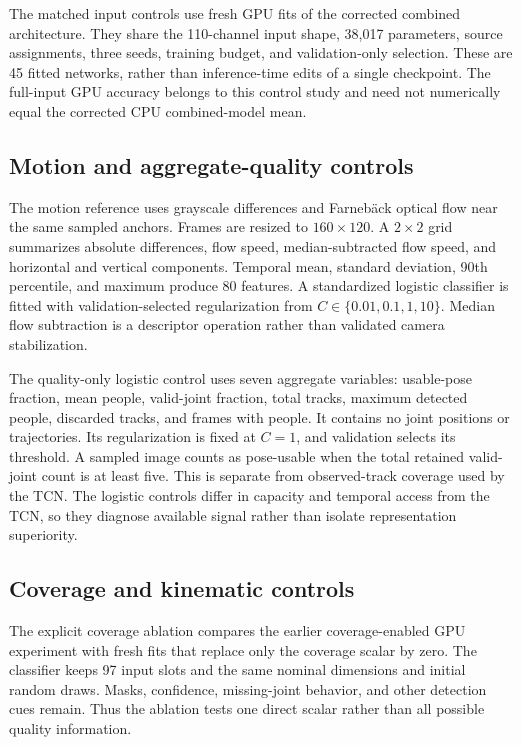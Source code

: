 \documentclass[journal]{IEEEtai}
\begin{document}
The matched input controls use fresh GPU fits of the corrected combined architecture. They share the 110-channel input shape, 38,017 parameters, source assignments, three seeds, training budget, and validation-only selection. These are 45 fitted networks, rather than inference-time edits of a single checkpoint. The full-input GPU accuracy belongs to this control study and need not numerically equal the corrected CPU combined-model mean.

\subsection{Motion and aggregate-quality controls}
The motion reference uses grayscale differences and Farneb\"ack optical flow \cite{farneback2003} near the same sampled anchors. Frames are resized to $160\times120$. A $2\times2$ grid summarizes absolute differences, flow speed, median-subtracted flow speed, and horizontal and vertical components. Temporal mean, standard deviation, 90th percentile, and maximum produce 80 features. A standardized logistic classifier is fitted with validation-selected regularization from $C\in\{0.01,0.1,1,10\}$. Median flow subtraction is a descriptor operation rather than validated camera stabilization.

The quality-only logistic control uses seven aggregate variables: usable-pose fraction, mean people, valid-joint fraction, total tracks, maximum detected people, discarded tracks, and frames with people. It contains no joint positions or trajectories. Its regularization is fixed at $C=1$, and validation selects its threshold. A sampled image counts as pose-usable when the total retained valid-joint count is at least five. This is separate from observed-track coverage used by the TCN. The logistic controls differ in capacity and temporal access from the TCN, so they diagnose available signal rather than isolate representation superiority.

\subsection{Coverage and kinematic controls}
The explicit coverage ablation compares the earlier coverage-enabled GPU experiment with fresh fits that replace only the coverage scalar by zero. The classifier keeps 97 input slots and the same nominal dimensions and initial random draws. Masks, confidence, missing-joint behavior, and other detection cues remain. Thus the ablation tests one direct scalar rather than all possible quality information.
\end{document}
